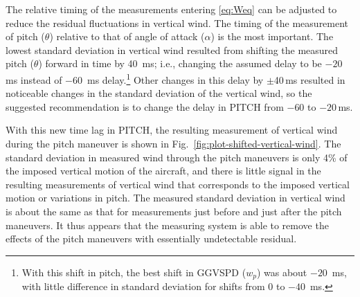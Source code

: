 \documentclass[12pt,twoside,english]{article}\usepackage[]{graphicx}\usepackage[]{color}
\let\OrgIndex\index
\renewcommand*{\index}[1]{\OrgIndex{#1}}
\begin{document}
The relative timing of the measurements entering \eqref{eq:Weq} can be adjusted to reduce the residual fluctuations in vertical wind. 
The timing of the measurement of pitch ($\theta$) relative to that of angle of attack ($\alpha$) is the most important. The lowest standard deviation in vertical wind resulted from shifting the measured pitch ($\theta$) forward in time by 40~ms; i.e., changing the assumed delay to be $-20$\,ms instead of $-60$~ms delay.\footnote{With this shift in pitch, 
the best shift in GGVSPD ($w_p$) was about $-20$~ms, with little difference in standard deviation for shifts from 0 to $-40$~ms.}
Other changes in this delay by $\pm$40\,ms resulted in noticeable changes in the
standard deviation of the vertical wind, so 
the suggested recommendation is to change the delay in PITCH from $-60$ to $-20$\,ms. 

With this new time lag in PITCH, the resulting measurement of vertical wind during the pitch maneuver is shown in Fig.~\ref{fig:plot-shifted-vertical-wind}. The standard deviation in measured wind through the pitch maneuvers is only 4\% of the imposed vertical motion of the aircraft, and
there is little signal in the resulting measurements of vertical wind that corresponds to the imposed vertical motion or variations in pitch. The measured standard deviation in vertical wind is about the same as that for measurements just before and just after the pitch maneuvers. It thus appears that the measuring system is able to remove the effects of the pitch maneuvers with essentially undetectable residual. 
% 
\end{document}
